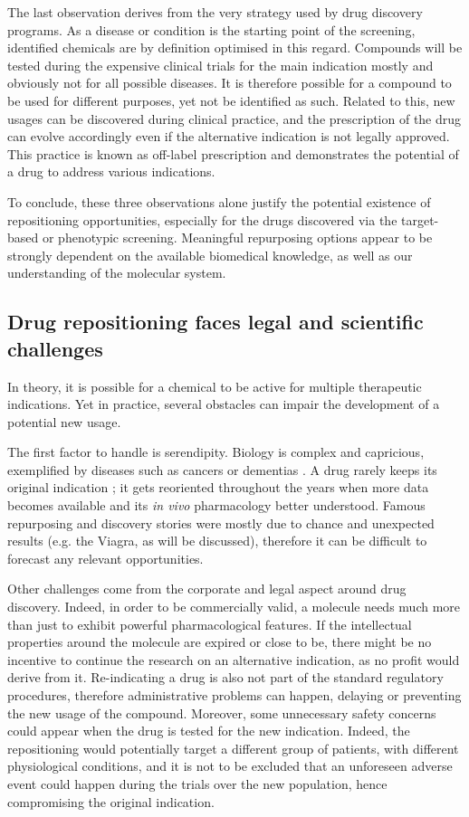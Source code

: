 The last observation derives from the very strategy used by drug discovery programs. As a disease or condition is the starting point of the screening, identified chemicals are by definition optimised in this regard. Compounds will be tested during the expensive clinical trials for the main indication mostly and obviously not for all possible diseases. It is therefore possible for a compound to be used for different purposes, yet not be identified as such. Related to this, new usages can be discovered during clinical practice, and the prescription of the drug can evolve accordingly even if the alternative indication is not legally approved. This practice is known as off-label prescription \citep{offlabelwiki} and demonstrates the potential of a drug to address various indications.

To conclude, these three observations alone justify the potential existence of repositioning opportunities, especially for the drugs discovered via the target-based or phenotypic screening. Meaningful repurposing options appear to be strongly dependent on the available biomedical knowledge, as well as our understanding of the molecular system.

\subsection{Drug repositioning faces legal and scientific challenges}
In theory, it is possible for a chemical to be active for multiple therapeutic indications. Yet in practice, several obstacles can impair the development of a potential new usage.

The first factor to handle is serendipity. Biology is complex and capricious, exemplified by diseases such as cancers or dementias \citep{ashburn2004drug}. A drug rarely keeps its original indication \citep{barratt2012drug}; it gets reoriented throughout the years when more data becomes available and its \emph{in vivo} pharmacology better understood. Famous repurposing and discovery stories were mostly due to chance and unexpected results (e.g. the Viagra, as will be discussed), therefore it can be difficult to forecast any relevant opportunities.

Other challenges come from the corporate and legal aspect around drug discovery. Indeed, in order to be commercially valid, a molecule needs much more than just to exhibit powerful pharmacological features. If the intellectual properties around the molecule are expired or close to be, there might be no incentive to continue the research on an alternative indication, as no profit would derive from it. Re-indicating a drug is also not part of the standard regulatory procedures, therefore administrative problems can happen, delaying or preventing the new usage of the compound. Moreover, some unnecessary safety concerns could appear when the drug is tested for the new indication. Indeed, the repositioning would potentially target a different group of patients, with different physiological conditions, and it is not to be excluded that an unforeseen adverse event could happen during the trials over the new population, hence compromising the original indication.

